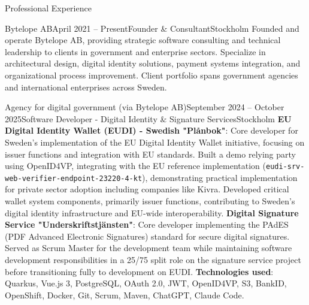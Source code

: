 \documentclass{resume}
\begin{document}
\begin{rSection}{Professional Experience}

\begin{rSubsection}{Bytelope AB}{April 2021 -- Present}{Founder \& Consultant}{Stockholm}
\bItem Founded and operate Bytelope AB, providing strategic software consulting and technical leadership to clients in government and enterprise sectors.
\bItem Specialize in architectural design, digital identity solutions, payment systems integration, and organizational process improvement.
\bItem Client portfolio spans government agencies and international enterprises across Sweden.
\end{rSubsection}

\begin{rClientSubsection}{Agency for digital government (via Bytelope AB)}{September 2024 -- October 2025}{Software Developer - Digital Identity \& Signature Services}{Stockholm} %
\bItem \textbf{EU Digital Identity Wallet (EUDI) - Swedish "Plånbok"}: Core developer for Sweden's implementation of the EU Digital Identity Wallet initiative, focusing on issuer functions and integration with EU standards.
\bItem Built a demo relying party using OpenID4VP, integrating with the EU reference implementation (\texttt{eudi-srv-web-verifier-endpoint-23220-4-kt}), demonstrating practical implementation for private sector adoption including companies like Kivra.
\bItem Developed critical wallet system components, primarily issuer functions, contributing to Sweden's digital identity infrastructure and EU-wide interoperability.
\bItem \textbf{Digital Signature Service "Underskriftstjänsten"}: Core developer implementing the PAdES (PDF Advanced Electronic Signatures) standard for secure digital signatures.
\bItem Served as Scrum Master for the development team while maintaining software development responsibilities in a 25/75 split role on the signature service project before transitioning fully to development on EUDI.
\bItem \textbf{Technologies used}: Quarkus, Vue.js 3, PostgreSQL, OAuth 2.0, JWT, OpenID4VP, S3, BankID, OpenShift, Docker, Git, Scrum, Maven, ChatGPT, Claude Code.
\end{rClientSubsection}


\end{rSection}
\end{document}
